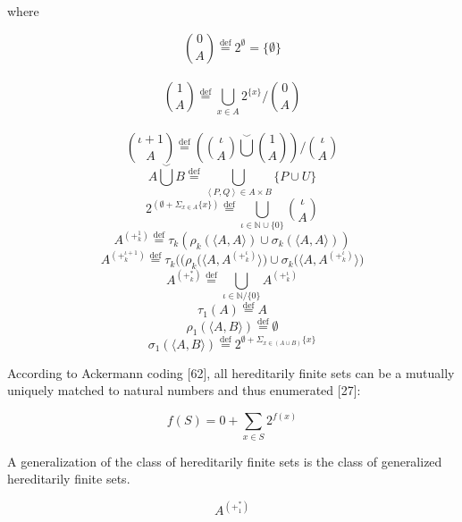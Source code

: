 \documentclass[10pt, a4paper]{article}
\newcommand*{\defeq}{\stackrel{\text{def}}{=}}
\begin{document}
\begin{multicols}{2}
\noindent where
\begin{center}
\[\binom{0}{A}\defeq2^{\emptyset} = \{\emptyset\}\]\\
\[\binom{1}{A} \defeq\bigcup\limits_{x\in{A}} 2^{\{x\}}/\binom{0}{A}\]\\
\[\binom{\iota+1}{A}\defeq \left( \binom{\iota}{A}\textstyle{\bigcup\limits^\smile} \displaystyle{\binom{1}{A}} \right) / \binom{\iota}{A} \]
\[A\textstyle{\bigcup\limits^\smile}B\defeq \displaystyle\bigcup\limits_{\left\langle P,Q\right\rangle\in{A\times B}} \{P\cup U\}\]
\[2^{\left(\emptyset+\Sigma_{x \in A} \{x\} \right)} \defeq \bigcup\limits_{\iota \in \mathbb{N} \cup \{0\}}\binom{\iota}{A}\]
\[A^{(+^1_k)}\defeq \tau_k(\rho_k(\langle A, A\rangle)\cup \sigma_k (\langle A, A\rangle))\]
\[A^{(+^{\iota+1}_k)}\defeq \tau_k\Big(\Big(\rho_k\Big(\Big\langle A, A^{(+^\iota_k)}\Big\rangle\Big)\cup \sigma_k \Big(\Big\langle A, A^{(+^\iota_k)}\Big\rangle\Big)\]
\[A^{(+^*_k)}\defeq \bigcup\limits_{\iota\in\mathbb{N}/\{0\}}A^{(+^\iota_k)}\]
\[\tau_1(A)\defeq A\]
\[\rho_1(\langle A,B \rangle)\defeq \emptyset\]
\[\sigma_1(\langle A, B \rangle) \defeq 2^{\emptyset + \Sigma_{x\in(A\cup B)}\{x\}}\]
\end{center}

According to Ackermann coding [62], all hereditarily
finite sets can be a mutually uniquely matched to natural
numbers and thus enumerated [27]:
\begin{center}
\[f(S) = 0 + \sum\limits_{x\in S}2^{f(x)}\]
\end{center}
\noindent A generalization of the class of hereditarily finite sets is
the class of generalized hereditarily finite sets.
\begin{center}
\[A^{(+^*_1)}\]
\end{center}


\end{multicols}
\end{document}
